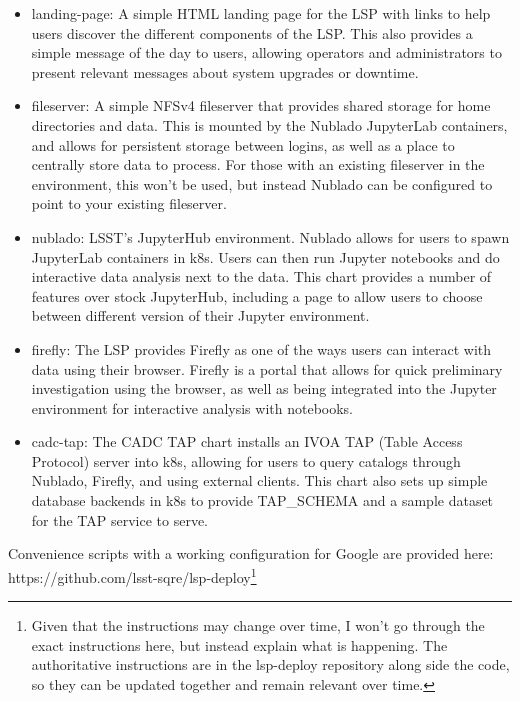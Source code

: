 \documentclass[11pt,twoside]{article}
\begin{document}
\begin{itemize}

\item landing-page: A simple HTML landing page for the LSP with links to help users
discover the different components of the LSP.  This also provides a simple message of
the day to users, allowing operators and administrators to present relevant
messages about system upgrades or downtime.

\item fileserver: A simple NFSv4 fileserver that provides shared storage for
home directories and data.  This is mounted by the Nublado JupyterLab containers,
and allows for persistent storage between logins, as well as a place to centrally
store data to process.  For those with an existing fileserver in the environment,
this won't be used, but instead Nublado can be configured to point to your existing
fileserver.

\item nublado: LSST's JupyterHub environment.  Nublado allows for users to spawn
JupyterLab containers in k8s.  Users can then run Jupyter notebooks and do interactive
data analysis next to the data.  This chart provides a number of
features over stock JupyterHub, including a page to allow users to choose between
different version of their Jupyter environment.

\item firefly: The LSP provides Firefly as one of the ways users can interact with
data using their browser.  Firefly is a portal that allows for quick preliminary
investigation using the browser, as well as being integrated into the Jupyter
environment for interactive analysis with notebooks.

\item cadc-tap: The CADC TAP chart installs an IVOA TAP (Table Access Protocol)
server into k8s, allowing for users to query catalogs through Nublado, Firefly,
and using external clients.  This chart also sets up simple database backends
in k8s to provide TAP\_SCHEMA and a sample dataset for the TAP service to serve.

\end{itemize}

Convenience scripts with a working configuration for Google are provided here:
https://github.com/lsst-sqre/lsp-deploy\footnote{Given that the instructions
may change over time, I won't go through the exact
instructions here, but instead explain what is happening.  The authoritative instructions
are in the lsp-deploy repository along side the code, so they can be updated together
and remain relevant over time.}
\end{document}
